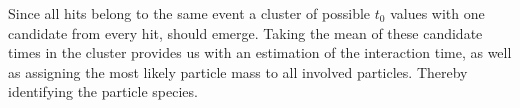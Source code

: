 \documentclass[../BTOF_summary.tex]{subfiles}
\begin{document}
Since all hits belong to the same event a cluster of possible $t_0$ values with one candidate from every hit, should emerge.
Taking the mean of these candidate times in the cluster provides us with an estimation of the interaction time, as well as assigning the most likely particle mass to all involved particles.
Thereby identifying the particle species.
\end{document}

